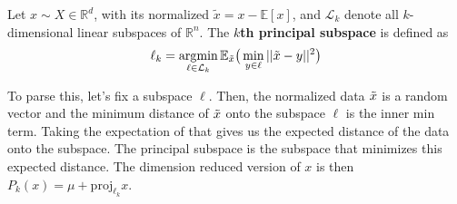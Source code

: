    \begin{definition}
      Let $x \sim X \in \mathbb{R}^d$, with its normalized $\tilde{x} = x - \mathbb{E}[x]$, and $\mathcal{L}_k$ denote all $k$-dimensional linear subspaces of $\mathbb{R}^n$. The \textbf{$k$th principal subspace} is defined as 
      \begin{equation}
        \ell_k = \operatorname*{\arg\!\min}_{\ell \in \mathcal{L}_k} \mathbb{E}_{\Tilde{x}} \big( \min_{y \in \ell} ||\Tilde{x} - y||^2 \big)
      \end{equation}

      To parse this, let's fix a subspace $\ell$. Then, the normalized data $\Tilde{x}$ is a random vector and the minimum distance of $\Tilde{x}$ onto the subspace $\ell$ is the inner min term. Taking the expectation of that gives us the expected distance of the data onto the subspace. The principal subspace is the subspace that minimizes this expected distance. The dimension reduced version of $x$ is then $P_k (x) = \mu + \mathrm{proj}_{\ell_k} x$. 

      \begin{figure}[H]
        \centering
        \begin{subfigure}[b]{0.4\textwidth}
        \centering
\end{subfigure}
\end{figure}
\end{definition}
